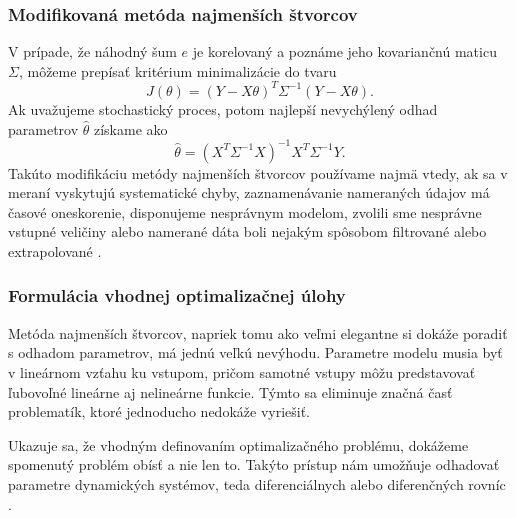 \subsubsection*{Modifikovaná metóda najmenších štvorcov}
V prípade, že náhodný šum $ e $ je korelovaný a poznáme jeho kovariančnú maticu $ \Sigma $, môžeme prepísať kritérium minimalizácie do tvaru 
\begin{equation}
	J\left(\theta\right) = \left(Y - X\theta \right)^T \Sigma^{-1} \left(Y - X\theta \right).
\end{equation}
Ak uvažujeme stochastický proces, potom najlepší nevychýlený odhad parametrov $ \hat{\theta} $ získame ako
\begin{equation}
	\hat{\theta} = \left(X^T \Sigma^{-1} X\right)^{-1}X^T \Sigma^{-1} Y.
\end{equation}
Takúto modifikáciu metódy najmenších štvorcov používame najmä vtedy, ak sa v meraní vyskytujú systematické chyby, zaznamenávanie nameraných údajov má časové oneskorenie, disponujeme nesprávnym modelom, zvolili sme nesprávne vstupné veličiny alebo namerané dáta boli nejakým spôsobom filtrované alebo extrapolované \cite{fikar:identifikacia:1999}.

\subsubsection*{Formulácia vhodnej optimalizačnej úlohy}
Metóda najmenších štvorcov, napriek tomu ako veľmi elegantne si dokáže poradiť s odhadom parametrov, má jednú veľkú nevýhodu. Parametre modelu musia byť v lineárnom vzťahu ku vstupom, pričom samotné vstupy môžu predstavovať ľubovoľné lineárne aj nelineárne funkcie. Týmto sa eliminuje značná časť problematík, ktoré jednoducho nedokáže vyriešiť. 

Ukazuje sa, že vhodným definovaním optimalizačného problému, dokážeme spomenutý problém obísť a nie len to. Takýto prístup nám umožňuje odhadovať parametre dynamických systémov, teda diferenciálnych alebo diferenčných rovníc \cite{villaverde:opt_param_est:2018}.

